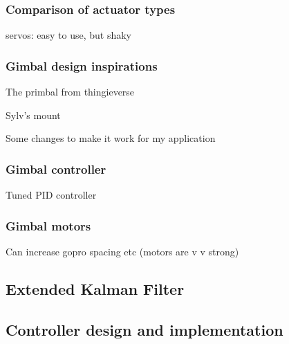 \subsubsection{Comparison of actuator types}
servos: easy to use, but shaky

\subsubsection{Gimbal design inspirations}
The primbal from thingieverse

Sylv's mount

Some changes to make it work for my application

\subsubsection{Gimbal controller}
Tuned PID controller

\subsubsection{Gimbal motors}
Can increase gopro spacing etc (motors are v v strong)


\subsection{Extended Kalman Filter}

\subsection{Controller design and implementation}
